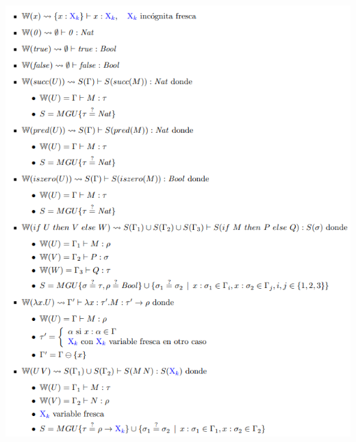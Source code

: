\documentclass[10pt,a4paper]{article}
\begin{document}
\begin{minipage}[b]{0.7\textwidth}
    \centering
    \includegraphics[width=\linewidth]{assets/algoritmo_w.png}
\end{minipage}
\end{document}

